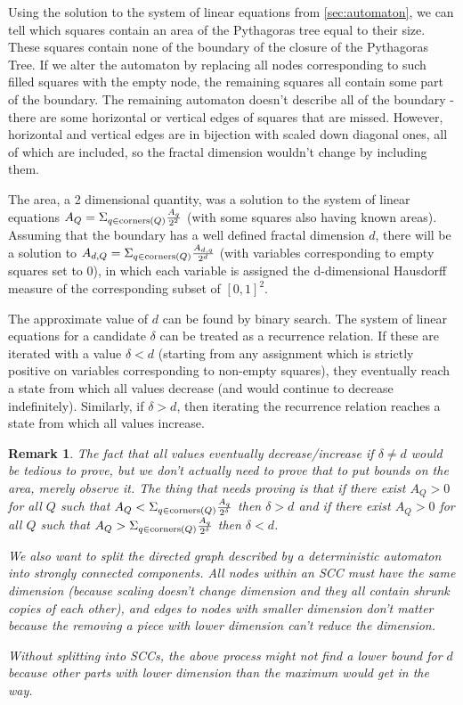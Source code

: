 \documentclass{article}
\newtheorem*{remark}{Remark}
\begin{document}
Using the solution to the system of linear equations from \ref{sec:automaton}, we can tell which squares contain an area of the Pythagoras tree equal to their size. These squares contain none of the boundary of the closure of the Pythagoras Tree. If we alter the automaton by replacing all nodes corresponding to such filled squares with the empty node, the remaining squares all contain some part of the boundary. The remaining automaton doesn't describe all of the boundary - there are some horizontal or vertical edges of squares that are missed. However, horizontal and vertical edges are in bijection with scaled down diagonal ones, all of which are included, so the fractal dimension wouldn't change by including them.

The area, a 2 dimensional quantity, was a solution to the system of linear equations $A_Q = \Sigma_{q\in\mathrm{corners}(Q)} {A_q\over 2^2}$ (with some squares also having known areas). Assuming that the boundary has a well defined fractal dimension $d$, there will be a solution to $A_{d,Q} = \Sigma_{q\in\mathrm{corners}(Q)} {A_{d,q}\over 2^d}$ (with variables corresponding to empty squares set to 0), in which each variable is assigned the d-dimensional Hausdorff measure of the corresponding subset of $[0,1]^2$.

The approximate value of $d$ can be found by binary search. The system of linear equations for a candidate $\delta$ can be treated as a recurrence relation. If these are iterated with a value $\delta<d$ (starting from any assignment which is strictly positive on variables corresponding to non-empty squares), they eventually reach a state from which all values decrease (and would continue to decrease indefinitely). Similarly, if $\delta>d$, then iterating the recurrence relation reaches a state from which all values increase.

\begin{remark}
	The fact that all values eventually decrease/increase if $\delta\not = d$ would be tedious to prove, but we don't actually need to prove that to put bounds on the area, merely observe it. The thing that needs proving is that if there exist $A_Q >0$ for all $Q$ such that $A_Q <  \Sigma_{q\in\mathrm{corners}(Q)} {A_{q}\over 2^\delta}$ then $\delta > d$ and if there exist $A_Q >0$ for all $Q$ such that $A_Q >  \Sigma_{q\in\mathrm{corners}(Q)} {A_{q}\over 2^\delta}$ then $\delta < d$.
	
	We also want to split the directed graph described by a deterministic automaton into strongly connected components. All nodes within an SCC must have the same dimension (because scaling doesn't change dimension and they all contain shrunk copies of each other), and edges to nodes with smaller dimension don't matter because the removing a piece with lower dimension can't reduce the dimension.
	
	Without splitting into SCCs, the above process might not find a lower bound for $d$ because other parts with lower dimension than the maximum would get in the way.
\end{remark}
\end{document}
